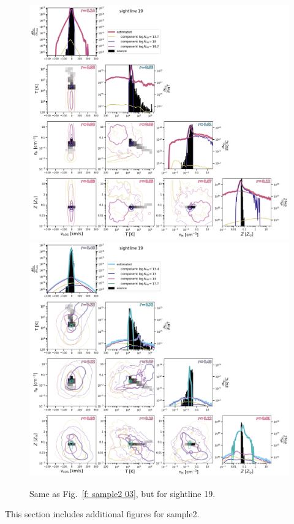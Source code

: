 \documentclass[fleqn,usenatbib]{mnras}
\begin{document}
\begin{figure}
    \centering
    \includegraphics[height=0.45\textheight]{figures/sample2/original/sightline_0019.png}
    \includegraphics[height=0.45\textheight]{figures/sample2/high-z/sightline_0019.png}
    \label{f: sample2 19}
    \caption{Same as Fig.~\ref{f: sample2 03}, but for sightline 19.}
\end{figure}

This section includes additional figures for sample2.



\bsp	%
\label{lastpage}
\end{document}
